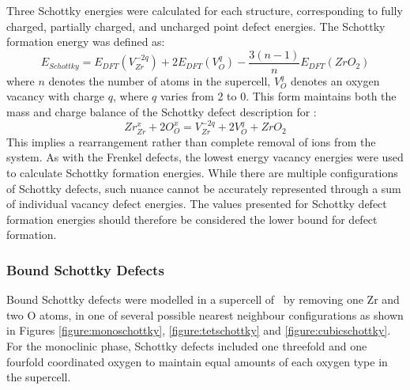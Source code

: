Three Schottky energies were calculated for each structure, corresponding to fully charged, partially charged, and uncharged point defect energies. The Schottky formation energy was defined as:
\begin{equation}
\label{equation_schottky}
E_{Schottky} = E_{DFT}(V^{-2q}_{Zr}) + 2E_{DFT}(V^{q}_{O}) -\frac{3(n-1)}{n}E_{DFT}(ZrO_2)%
\end{equation}
where $n$ denotes the number of atoms in the supercell, $V^{q}_{O}$ denotes an oxygen vacancy with charge $q$, where $q$ varies from 2 to 0. This form maintains both the mass and charge balance of the Schottky defect description for \zirconia :
\begin{equation}
\label{generic_schottky}
Zr^{x}_{Zr} + 2O^{x}_{O} = V^{-2q}_{Zr} + 2V^{q}_{O} + ZrO_{2}
\end{equation}
This implies a rearrangement rather than complete removal of ions from the system. As with the Frenkel defects, the lowest energy vacancy energies were used to calculate Schottky formation energies. While there are multiple configurations of Schottky defects, such nuance cannot be accurately represented through a sum of individual vacancy defect energies. The values presented for Schottky defect formation energies should therefore be considered the lower bound for defect formation. 

\subsubsection{Bound Schottky Defects}

Bound Schottky defects were modelled in a supercell of \zirconia\ by removing one Zr and two O atoms, in one of several possible nearest neighbour configurations as shown in Figures \ref{figure:monoschottky}, \ref{figure:tetschottky} and \ref{figure:cubicschottky}. For the monoclinic phase, Schottky defects included one threefold and one fourfold coordinated oxygen to maintain equal amounts of each oxygen type in the supercell.

